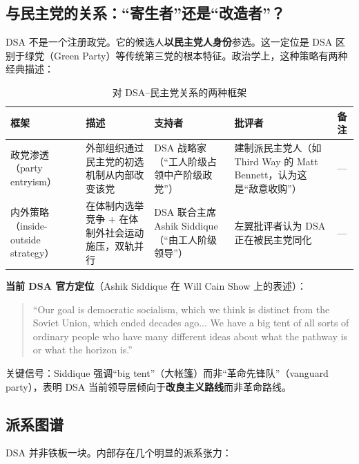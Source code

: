 \documentclass[12pt,a4paper]{ctexart}
\begin{document}
\subsection{与民主党的关系：``寄生者''还是``改造者''？}

DSA 不是一个注册政党。它的候选人\textbf{以民主党人身份}参选。这一定位是 DSA 区别于绿党（Green Party）等传统第三党的根本特征。政治学上，这种策略有两种经典描述：

\begin{table}[h]
\centering
\caption{对 DSA--民主党关系的两种框架}
\begin{tabular}{@{}lp{3.4cm}p{3.4cm}p{3.2cm}p{3.2cm}@{}}
\toprule
\textbf{框架} & \textbf{描述} & \textbf{支持者} & \textbf{批评者} & \textbf{备注} \\
\midrule
政党渗透（party entryism） & 外部组织通过民主党的初选机制从内部改变该党 & DSA 战略家（``工人阶级占领中产阶级政党''） & 建制派民主党人（如 Third Way 的 Matt Bennett，认为这是``敌意收购''） & --- \\
内外策略（inside-outside strategy） & 在体制内选举竞争 + 在体制外社会运动施压，双轨并行 & DSA 联合主席 Ashik Siddique（``由工人阶级领导''） & 左翼批评者认为 DSA 正在被民主党同化 & --- \\
\bottomrule
\end{tabular}
\end{table}

\textbf{当前 DSA 官方定位}（Ashik Siddique 在 Will Cain Show 上的表述）：

\begin{quote}
``Our goal is democratic socialism, which we think is distinct from the Soviet Union, which ended decades ago... We have a big tent of all sorts of ordinary people who have many different ideas about what the pathway is or what the horizon is.''
\end{quote}

关键信号：Siddique 强调``big tent''（大帐篷）而非``革命先锋队''（vanguard party），表明 DSA 当前领导层倾向于\textbf{改良主义路线}而非革命路线。

\subsection{派系图谱}

DSA 并非铁板一块。内部存在几个明显的派系张力：
\end{document}
